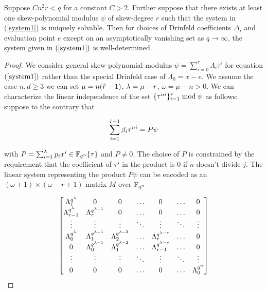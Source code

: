 \begin{lemma}\label{detdeg}
Suppose $Cn^2r < q$ for a constant $C>2$. Further suppose that there exists at least one skew-polynomial modulus $\psi$ of skew-degree $r$ such that the system in (\ref{system1}) is uniquely solvable. Then for choices of Drinfeld coefficients $\Delta_i$ and evaluation point $e$ except on an asymptotically vanishing set as $q \to \infty$, the system given in $(\ref{system1})$ is well-determined.
\end{lemma}

\begin{proof}
We consider general skew-polynomial modulus $\psi = \sum_{i=0}^{r} \Lambda_i \tau^i$ for equation $(\ref{system1})$ rather than the special Drinfeld case of $\Lambda_0 = x - e$. We assume the case $n,d \geq 3$ we can set $\mu = n(\hat{r} - 1)$, $\lambda = \mu - r$, $\omega = \mu - n > 0$. We can characterize the linear independence of the set $\{\tau^{ni} \}_{i =1}^{\hat{r}} \bmod \psi$ as follows: suppose to the contrary that

\begin{equation}\label{mult}
    \sum_{i=1}^{\hat{r} - 1} \beta_i \tau^{ni} = P \psi
\end{equation}

with $P = \sum_{i= 1}^{\lambda} p_ix^i \in \mathbb{F}_{q^n}\{\tau \}$ and $P \neq 0 $. The choice of $P$ is constrained by the requirement that the coefficient of $\tau^{j}$ in the product is 0 if $n$ doesn't divide $j$. The linear system representing the product $P\psi$ can be encoded as an $ (\omega + 1) \times (\omega - r + 1)$ matrix $M$ over $\mathbb{F}_{q^n}$

\begin{equation}
    \label{productsystem}
    \begin{bmatrix}
    \Lambda_{r}^{q^{\lambda}} & 0 & 0 & \ldots & 0 & \ldots & 0 \\
    \Lambda_{r - 1}^{q^{\lambda}} & \Lambda_{r}^{q^{\lambda - 1}} & 0 & \ldots & 0 & \ldots & 0 \\
    \vdots & \vdots & \vdots & \ddots & \vdots & \ddots & \vdots \\
    \Lambda_{0}^{q^{\lambda}} & \Lambda_{1}^{q^{\lambda - 1}} & \Lambda_{2}^{q^{\lambda - 2}} & \ldots & \Lambda_{r}^{q^{\lambda - r}} & \ldots & 0 \\
    0 & \Lambda_{0}^{q^{\lambda - 1}} & \Lambda_{1}^{q^{\lambda - 2}} & \ldots & \Lambda_{r-1}^{q^{\lambda - r}} & \ldots & 0 \\
    \vdots & \vdots & \vdots & \ddots & \vdots & \ddots & \vdots \\
    0 & 0 & 0 & \ldots & 0 & \ldots & \Lambda_0^{q^{n}}
    

\end{bmatrix}
\end{equation}
\end{proof}

